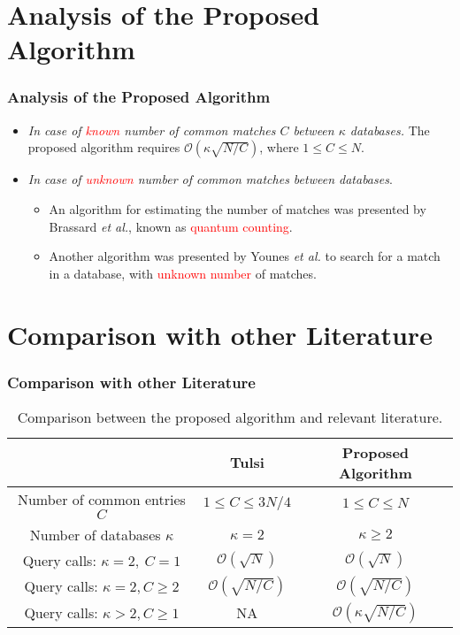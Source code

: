 \documentclass{beamer}
\begin{document}
\section{Analysis of the Proposed Algorithm}
\begin{frame}
\frametitle{Analysis of the Proposed Algorithm}

\begin{itemize}

\item \textit{In case of \textcolor{red}{known} number of common matches $C$ between $\kappa$ databases.} The proposed algorithm requires $\mathcal{O}(\kappa\sqrt{N/C})$, where $1\leq C\leq N$. 

\item \textit{In case of \textcolor{red}{unknown} number of common matches between databases}. 
\begin{itemize}
\item An algorithm \cite{quant-count} for estimating the number of matches was presented by Brassard \textit{et al.}, known as \textcolor{red}{quantum counting}.

\item Another algorithm \cite{younes} was presented by Younes \textit{et al.} to search for a match in a database, with \textcolor{red}{unknown number} of matches.

\end{itemize}

\end{itemize}


\end{frame}

\section{Comparison with other Literature}
\begin{frame}
\frametitle{Comparison with other Literature}
\begin{table}[H]
\begin{tabular}{|c|c|c|}
\hline
& Tulsi \cite{tulsi} &Proposed Algorithm \\
\hline
Number of common entries $C$ & $1\leq C\leq 3N/4$ & $1\leq C\leq N$ \\ \hline
Number of databases $\kappa$ & $\kappa=2$ & $\kappa\geq 2$ \\ \hline
Query calls: $\kappa=2,~C=1$ & $\mathcal{O}(\sqrt{N})$ & $\mathcal{O}(\sqrt{N})$ \\ \hline 
Query calls: $\kappa=2,C\geq 2$ & $\mathcal{O}(\sqrt{N/C})$ & $\mathcal{O}(\sqrt{N/C})$  \\ \hline
Query calls: $\kappa>2, C\geq 1$ & NA & $\mathcal{O}(\kappa\sqrt{N/C})$  \\ \hline 


\end{tabular} 

\caption{Comparison between the proposed algorithm and relevant literature.}

\end{table}


\end{frame}
\end{document}
